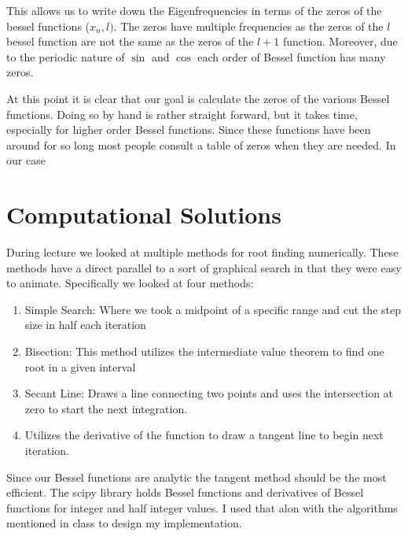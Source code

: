 This allows us to write down the Eigenfrequencies in terms of the zeros of the bessel functions ($x_n,l)$.
The zeros have multiple frequencies as the zeros of the $l$ bessel function are not the same as the zeros of the $l+1$ function. Moreover, due to the periodic nature of $\sin$ and $\cos$ each order of Bessel function has many zeros.

At this point it is clear that our goal is calculate the zeros of the various Bessel functions. Doing so by hand is rather straight forward, but it takes time, especially for higher order Bessel functions. Since these functions have been around for so long most people consult a table of zeros when they are needed. In our case

\section{Computational Solutions}
During lecture we looked at multiple methods for root finding numerically. These methods have a direct parallel to a sort of graphical search in that they were easy to animate. Specifically we looked at four methods:
\begin{enumerate}
    \item Simple Search: Where we took a midpoint of a specific range and cut the step size in half each iteration
    \item Bisection: This method utilizes the intermediate value theorem to find one root in a given interval
    \item Secant Line: Draws a line connecting two points and uses the intersection at zero to start the next integration.
    \item Utilizes the derivative of the function to draw a tangent line to begin next iteration.
\end{enumerate}
Since our Bessel functions are analytic the tangent method should be the most efficient. The scipy library holds Bessel functions and derivatives of Bessel functions for integer and half integer values. I used that alon with the algorithms mentioned in class to design my implementation.

